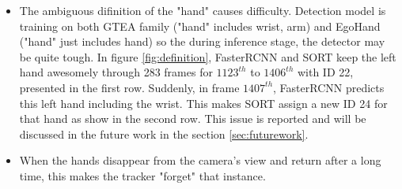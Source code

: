 \begin{itemize}
	\item The ambiguous  difinition of the "hand" causes difficulty. Detection model is training on both GTEA family ("hand" includes wrist, arm) and EgoHand ("hand" just includes hand) so the during inference stage, the detector may be quite tough. In figure \ref{fig:definition}, FasterRCNN and SORT keep the left hand awesomely through 283 frames for \(1123^{th}\) to \(1406^{th}\) with ID 22, presented in the first row. Suddenly, in frame \(1407^{th}\), FasterRCNN predicts this left hand including the wrist. This makes SORT assign a new ID 24 for that hand as show in the second row. This issue is reported and will be discussed in the future work in the section \ref{sec:futurework}.
	\item When the hands disappear from the camera’s view and return after a long time, this makes the tracker "forget" that instance.
\end{itemize}
